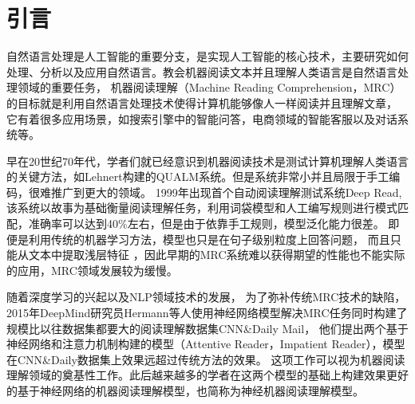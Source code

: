 \section{引言}


自然语言处理是人工智能的重要分支，是实现人工智能的核心技术，主要研究如何处理、分析以及应用自然语言。教会机器阅读文本并且理解人类语言是自然语言处理领域的重要任务，
机器阅读理解（Machine Reading Comprehension，MRC）的目标就是利用自然语言处理技术使得计算机能够像人一样阅读并且理解文章，
它有着很多应用场景，如搜索引擎中的智能问答，电商领域的智能客服以及对话系统等。

早在20世纪70年代，学者们就已经意识到机器阅读技术是测试计算机理解人类语言的关键方法，如Lehnert构建的QUALM系统。但是系统非常小并且局限于手工编码，很难推广到更大的领域。
1999年出现首个自动阅读理解测试系统Deep Read,该系统以故事为基础衡量阅读理解任务，利用词袋模型和人工编写规则进行模式匹配，准确率可以达到40\%左右，但是由于依靠手工规则，模型泛化能力很差。
即便是利用传统的机器学习方法，模型也只是在句子级别粒度上回答问题，
而且只能从文本中提取浅层特征
，因此早期的MRC系统难以获得期望的性能也不能实际的应用，MRC领域发展较为缓慢。

随着深度学习的兴起以及NLP领域技术的发展，
为了弥补传统MRC技术的缺陷，2015年DeepMind研究员Hermann等人使用神经网络模型解决MRC任务同时构建了规模比以往数据集都要大的阅读理解数据集CNN\&Daily Mail，
他们提出两个基于神经网络和注意力机制构建的模型（Attentive Reader，Impatient Reader），模型在CNN\&Daily数据集上效果远超过传统方法的效果。
这项工作可以视为机器阅读理解领域的奠基性工作。此后越来越多的学者在这两个模型的基础上构建效果更好的基于神经网络的机器阅读理解模型，也简称为神经机器阅读理解模型。

